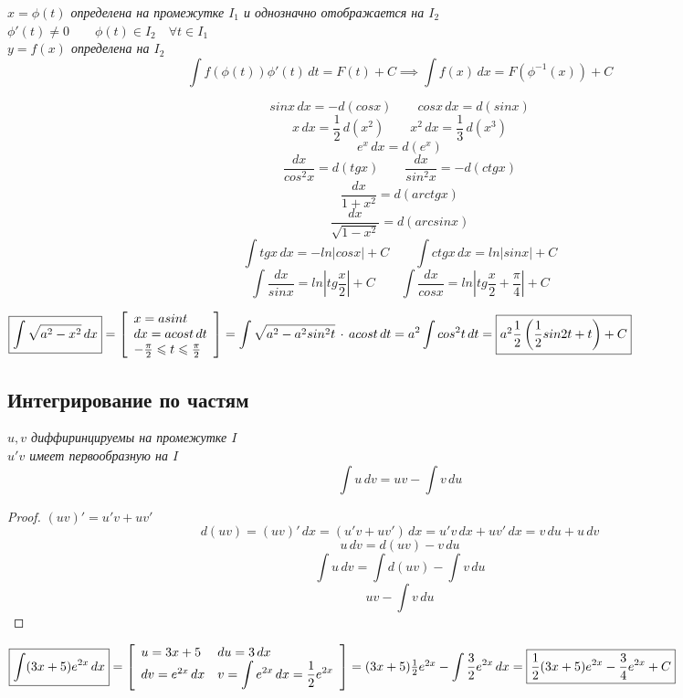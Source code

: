 \begin{theorem}
\textit{
  $x = \phi(t)$ определена на промежутке $I_1$ и однозначно отображается на $I_2$ \\
  $\phi'(t) \neq 0 \qquad \phi(t) \in I_2 \quad \forall t \in I_1$ \\
  $y = f(x)$ определена на $I_2$
}
$$\int f(\phi(t))\phi'(t)\,dt = F(t) + C \implies \int f(x)\,dx = F(\phi^{-1}(x)) + C$$
\end{theorem}
\begin{corollary}
$$sinx\,dx = -d(cosx) \qquad cosx\,dx = d(sinx)$$
$$x\,dx = \frac{1}{2}\,d(x^2) \qquad x^2\,dx = \frac{1}{3}\,d(x^3)$$
$$e^x\,dx = d(e^x)$$
$$\frac{dx}{cos^2x} = d(tgx) \qquad \frac{dx}{sin^2x} = -d(ctgx)$$
$$\frac{dx}{1 + x^2} = d(arctgx)$$
$$\frac{dx}{\sqrt{1 - x^2}} = d(arcsinx)$$
$$\int tgx\,dx = -ln|cosx| + C \qquad \int ctgx\,dx = ln|sinx| + C$$
$$\int \frac{dx}{sinx} = ln\left|tg\frac{x}{2}\right| + C \qquad \int \frac{dx}{cosx} = ln\left|tg\frac{x}{2} + \frac{\pi}{4}\right| + C$$
\end{corollary}

\begin{eg}
$
  \fbox{$\displaystyle\int\sqrt{a^2 - x^2}\,dx$} = \left[
  \begin{array}{l}
  x = asint \\
  dx = acost\,dt \\
  -\frac{\pi}{2} \leqslant t \leqslant \frac{\pi}{2}
  \end{array}
  \right] = \displaystyle\int\sqrt{a^2 - a^2sin^2t}\,\cdot\,acost\,dt = a^2\int cos^2t\,dt = \fbox{$a^2\displaystyle\frac{1}{2}\left(\frac{1}{2}sin2t + t\right) + C$}
$
\end{eg}

\subsection{Интегрирование по частям}

\begin{theorem}
\textit{
  $u, v$ диффиринцируемы на промежутке $I$ \\
  $u'v$ имеет первообразную на $I$
}
$$\int u\,dv = uv - \int v\,du$$
\end{theorem}
\begin{proof}
$(uv)' = u'v + uv'$
$$d(uv) = (uv)'\,dx = (u'v + uv')\,dx = u'v\,dx + uv'\,dx = v\,du + u\,dv$$
$$u\,dv = d(uv) - v\,du$$
$$\int u\,dv = \int d(uv) - \int v\,du$$
$$uv - \int v\,du$$
\end{proof}

\begin{eg}
$
  \fbox{$\displaystyle\int(3x + 5)e^{2x}\,dx$} = \left[
  \begin{array}{ll}
  u = 3x + 5 & du = 3\,dx \\
  dv = e^{2x}\,dx & v = \displaystyle\int e^{2x}\,dx = \frac{1}{2}e^{2x}
  \end{array}
  \right] = (3x + 5)\frac{1}{2}e^{2x} - \displaystyle\int\frac{3}{2}e^{2x}\,dx = \fbox{$\displaystyle\frac{1}{2}(3x + 5)e^{2x} - \frac{3}{4}e^{2x} + C$}
$
\end{eg}

